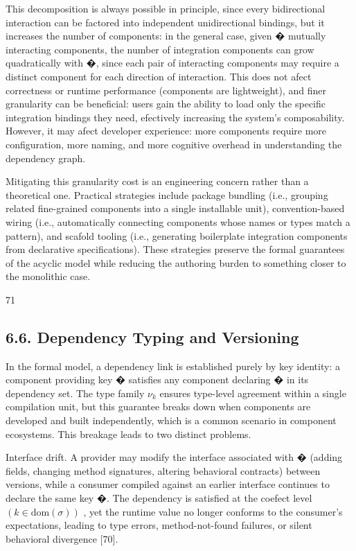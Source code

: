\documentclass[
  10
]{article}
\begin{document}
This decomposition is always possible in principle, since every
bidirectional interaction can be factored into independent
unidirectional bindings, but it increases the number of components: in
the general case, given � mutually interacting components, the number of
integration components can grow quadratically with �, since each pair of
interacting components may require a distinct component for each
direction of interaction. This does not afect correctness or runtime
performance (components are lightweight), and finer granularity can be
beneficial: users gain the ability to load only the specific integration
bindings they need, efectively increasing the system's composability.
However, it may afect developer experience: more components require more
configuration, more naming, and more cognitive overhead in understanding
the dependency graph.

Mitigating this granularity cost is an engineering concern rather than a
theoretical one. Practical strategies include package bundling (i.e.,
grouping related fine-grained components into a single installable
unit), convention-based wiring (i.e., automatically connecting
components whose names or types match a pattern), and scafold tooling
(i.e., generating boilerplate integration components from declarative
specifications). These strategies preserve the formal guarantees of the
acyclic model while reducing the authoring burden to something closer to
the monolithic case.

71

\subsection{6.6. Dependency Typing and
Versioning}\label{dependency-typing-and-versioning}

In the formal model, a dependency link is established purely by key
identity: a component providing key � satisfies any component declaring
� in its dependency set. The type family \(\nu _ { k }\) ensures
type-level agreement within a single compilation unit, but this
guarantee breaks down when components are developed and built
independently, which is a common scenario in component ecosystems. This
breakage leads to two distinct problems.

Interface drift. A provider may modify the interface associated with �
(adding fields, changing method signatures, altering behavioral
contracts) between versions, while a consumer compiled against an
earlier interface continues to declare the same key �. The dependency is
satisfied at the coefect level
\(( k \in \mathrm { d o m } ( \sigma ) )\) , yet the runtime value no
longer conforms to the consumer's expectations, leading to type errors,
method-not-found failures, or silent behavioral divergence {[}70{]}.
\end{document}
